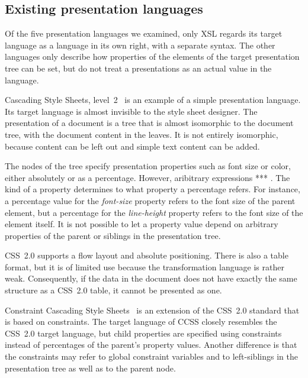 %																
\subsection{Existing presentation languages} \label{sect:existingtarget}


Of the five presentation languages we examined, only XSL regards its target language as a language in its own right, with a separate syntax. The other languages only describe how properties of the elements of the target presentation tree can be set, but do not treat a presentations as an actual value in the language.

 Cascading Style Sheets, level~2~\cite{css2} is an example of a simple presentation language. Its target language is almost invisible to the style sheet designer. The presentation of a document is a tree that is almost isomorphic to the document tree, with the document content in the leaves. It is not entirely isomorphic, because content can be left out and simple text content can be added. 
\toHere

The nodes of the tree specify presentation properties such as font size or color, either absolutely or as a percentage. However, aribitrary expressions *** . The kind of a property determines to what property a percentage refers. For instance, a percentage value for the {\em font-size} property refers to the font size of the parent element, but a percentage for the {\em line-height} property refers to the font size of the element itself. It is not possible to let a property value depend on arbitrary properties of the parent or siblings in the presentation tree.

\fromHere

CSS~2.0 supports a flow layout and absolute positioning. There is also a table format, but it is of limited use because the transformation language is rather weak. Consequently, if the data in the document does not have exactly the same structure as a CSS~2.0 table, it cannot be presented as one.

 Constraint Cascading Style Sheets~\cite{badros99ccss} is an extension of the CSS~2.0 standard that is based on constraints. The target language of CCSS closely resembles the CSS~2.0 target language, but child properties are specified using constraints instead of percentages of the parent's property values. Another difference is that the constraints may refer to global constraint variables and to left-siblings in the presentation tree as well as to the parent node. 

